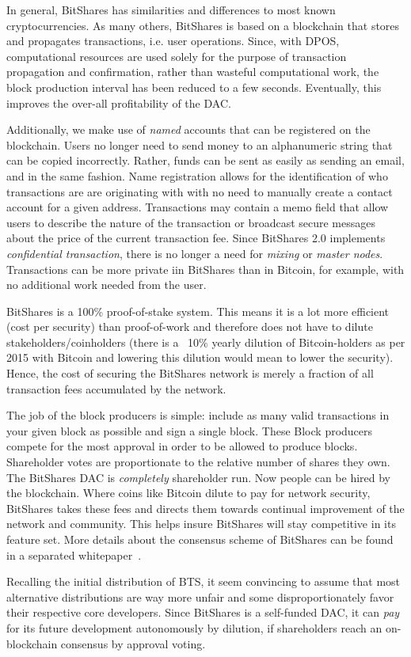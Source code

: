 In general, BitShares has similarities and differences to most known
cryptocurrencies. As many others, BitShares is based on a blockchain that
stores and propagates transactions, i.e. user operations. Since, with DPOS,
computational resources are used solely for the purpose of transaction
propagation and confirmation, rather than wasteful computational work, the
block production interval has been reduced to a few seconds. Eventually, this
improves the over-all profitability of the DAC.

Additionally, we make use of \emph{named} accounts that can be registered on
the blockchain. Users no longer need to send money to an alphanumeric string
that can be copied incorrectly. Rather, funds can be sent as easily as sending
an email, and in the same fashion. Name registration allows for the
identification of who transactions are are originating with with no need to
manually create a contact account for a given address. Transactions may contain
a memo field that allow users to describe the nature of the transaction or
broadcast secure messages about the price of the current transaction fee. Since
BitShares 2.0 implements \emph{confidential transaction}, there is no longer a
need for \emph{mixing} or \emph{master nodes}. Transactions can be more private
iin BitShares than in Bitcoin, for example, with no additional work needed from
the user.

BitShares is a 100\% proof-of-stake system. This means it is a lot more
efficient (cost per security) than proof-of-work and therefore does not have to
dilute stakeholders/coinholders (there is a ~10\% yearly dilution of
Bitcoin-holders as per 2015 with Bitcoin and lowering this dilution would mean
to lower the security). Hence, the cost of securing the BitShares network is
merely a fraction of all transaction fees accumulated by the network. 

The job of the block producers is simple: include as many valid transactions in
your given block as possible and sign a single block. These Block producers
compete for the most approval in order to be allowed to produce blocks.
Shareholder votes are proportionate to the relative number of shares they own.
The BitShares DAC is \emph{completely} shareholder run. Now people can be hired
by the blockchain. Where coins like Bitcoin dilute to pay for network security,
BitShares takes these fees and directs them towards continual improvement of
the network and community. This helps insure BitShares will stay competitive in
its feature set. More details about the consensus scheme of BitShares can be
found in a separated whitepaper~\cite{}.

Recalling the initial distribution of BTS, it seem convincing to assume that
most alternative distributions are way more unfair and some disproportionately
favor their respective core developers. Since BitShares is a self-funded DAC,
it can \emph{pay} for its future development autonomously by dilution, if
shareholders reach an on-blockchain consensus by approval voting.


